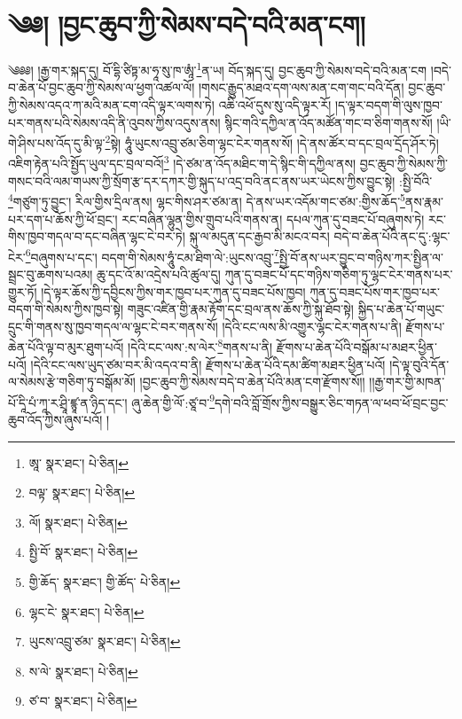 \setcounter{footnote}{0} 
\chapter{༄༅། །བྱང་ཆུབ་ཀྱི་སེམས་བདེ་བའི་མན་ངག།}༄༅༅། །རྒྱ་གར་སྐད་དུ། བོ་དྷི་ཙིཏྟ་མ་ཧཱ་སུ་ཁ་ཨཱཾ་\footnote{ཨཱ་  སྣར་ཐང་།  པེ་ཅིན། }ན་ཡ། བོད་སྐད་དུ། བྱང་ཆུབ་ཀྱི་སེམས་བདེ་བའི་མན་ངག །བདེ་བ་ཆེན་པོ་བྱང་ཆུབ་ཀྱི་སེམས་ལ་ཕྱག་འཚལ་ལོ། །གསང་རྒྱུད་མཐའ་དག་ལས་མན་ངག་གང་བའི་དོན། བྱང་ཆུབ་ཀྱི་སེམས་འདའ་ཀ་མའི་མན་ངག་འདི་ལྟར་ལགས་ཏེ། འཆི་འཕོ་དུས་སུ་འདི་ལྟར་རོ། །ད་ལྟར་བདག་གི་ལུས་ཁྱབ་པར་གནས་པའི་སེམས་འདི་ནི་འུབས་ཀྱིས་འདུས་ནས། སྙིང་གའི་དཀྱིལ་ན་འོད་མཚོན་གང་བ་ཅིག་གནས་སོ། །ཡི་གེ་ཤིས་པས་འོད་དུ་མི་ལྟ་\footnote{བལྟ་  སྣར་ཐང་།  པེ་ཅིན། }སྟེ། ཧཱུཾ་ཡུངས་འབྲུ་ཙམ་ཅིག་ལྷང་ངེར་གནས་སོ། །དེ་ནས་ཚོར་བ་དང་བྲལ་དྲོད་ཤོར་ཏེ། འཇིག་རྟེན་པའི་སྤྱོད་ཡུལ་དང་བྲལ་བའོ།\footnote{ལོ།  སྣར་ཐང་།  པེ་ཅིན། } །དེ་ཙམ་ན་འོད་མཐིང་ག་དེ་སྙིང་གི་དཀྱིལ་ནས། བྱང་ཆུབ་ཀྱི་སེམས་ཀྱི་གསང་བའི་ལམ་གཡས་ཀྱི་སྲོག་རྩ་དར་དཀར་གྱི་སྐུད་པ་འདྲ་བའི་ནང་ནས་ཡར་ཡེངས་ཀྱིས་བྱུང་སྟེ། :སྤྱི་བོའི་\footnote{སྤྱི་བོ་  སྣར་ཐང་།  པེ་ཅིན། }གཙུག་ཏུ་བྱུང་། རིལ་གྱིས་དྲིལ་ནས། ལྷང་གིས་ཤར་ཙམ་ན། དེ་ནས་ཡར་འདོམ་གང་ཙམ་:གྱིས་ཆོད་\footnote{གྱི་ཆོད་  སྣར་ཐང་། གྱི་ཚོད་  པེ་ཅིན། }ནས་རྣམ་པར་དག་པ་ཆོས་ཀྱི་ཕོ་བྲང་། རང་བཞིན་ལྷུན་གྱིས་གྲུབ་པའི་གནས་ན། དཔལ་ཀུན་དུ་བཟང་པོ་བཞུགས་ཏེ། རང་གིས་ཁྱབ་གདལ་བ་དང་བཞིན་ལྷང་ངེ་བར་ཏེ། སྐུ་ལ་མདུན་དང་རྒྱབ་མི་མངའ་བར། བདེ་བ་ཆེན་པོའི་ནང་དུ་:ལྷང་ངེར་\footnote{ལྷང་ངེ་  སྣར་ཐང་།  པེ་ཅིན། }བཞུགས་པ་དང་། བདག་གི་སེམས་ཧཱུཾ་ངམ་ཐིག་ལེ་:ཡུངས་འབྲུ་\footnote{ཡུངས་འབྲུ་ཙམ་  སྣར་ཐང་།  པེ་ཅིན། }སྤྱི་བོ་ནས་ཡར་བྱུང་བ་གཉིས་ཀར་སྤྱིན་ལ་སྦྲང་བུ་ཆགས་པའམ། ཆུ་དང་འོ་མ་འདྲེས་པའི་ཚུལ་དུ། ཀུན་དུ་བཟང་པོ་དང་གཉིས་གཅིག་ཏུ་ལྷང་ངེར་གནས་པར་གྱུར་ཏོ། །དེ་ལྟར་ཆོས་ཀྱི་དབྱིངས་ཀྱིས་གར་ཁྱབ་པར་ཀུན་དུ་བཟང་པོས་ཁྱབ། ཀུན་དུ་བཟང་པོས་གར་ཁྱབ་པར་བདག་གི་སེམས་ཀྱིས་ཁྱབ་སྟེ། གཟུང་འཛིན་གྱི་རྣམ་རྟོག་དང་བྲལ་ནས་ཆོས་ཀྱི་སྐུ་ཐོབ་སྟེ། སྐྱིད་པ་ཆེན་པོ་གཡུང་དྲུང་གི་གནས་སུ་ཁྱབ་གདལ་ལ་ལྷང་ངེ་བར་གནས་སོ། །དེའི་ངང་ལས་མི་འགྱུར་ལྷང་ངེར་གནས་པ་ནི། རྫོགས་པ་ཆེན་པོའི་ལྟ་བ་མུར་ཐུག་པའོ། །དེའི་ངང་ལས་:ས་ལེར་\footnote{ས་ལེ་  སྣར་ཐང་།  པེ་ཅིན། }གནས་པ་ནི། རྫོགས་པ་ཆེན་པོའི་བསྒོམ་པ་མཐར་ཕྱིན་པའོ། །དེའི་ངང་ལས་ཡུད་ཙམ་བར་མི་འདའ་བ་ནི། རྫོགས་པ་ཆེན་པོའི་དམ་ཚིག་མཐར་ཕྱིན་པའོ། །དེ་ལྟ་བུའི་དོན་ལ་སེམས་རྩེ་གཅིག་ཏུ་བསྒོམ་མོ། །བྱང་ཆུབ་ཀྱི་སེམས་བདེ་བ་ཆེན་པོའི་མན་ངག་རྫོགས་སོ།། །།རྒྱ་གར་གྱི་མཁན་པོ་དཱི་པཾ་ཀཱ་ར་ཤྲཱི་ཛྙཱ་ན་ཉིད་དང་། ཞུ་ཆེན་གྱི་ལོ་:ཙཱ་བ་\footnote{ཙ་བ་  སྣར་ཐང་།  པེ་ཅིན། }དགེ་བའི་བློ་གྲོས་ཀྱིས་བསྒྱུར་ཅིང་གཏན་ལ་ཕབ་ཕོ་བྲང་བྱང་ཆུབ་འོད་ཀྱིས་ཞུས་པའོ། ། 